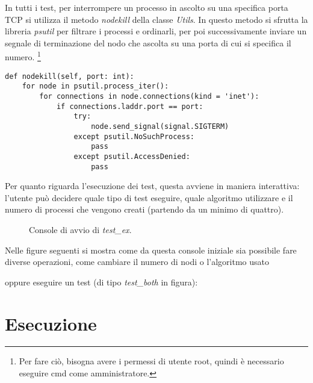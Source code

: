 \documentclass[conference]{IEEEtran}
\begin{document}
In tutti i test, per interrompere un processo in ascolto su una specifica porta TCP si utilizza il metodo \textit{nodekill} della classe \textit{Utils}.
In questo metodo si sfrutta la libreria \textit{psutil} per filtrare i processi e ordinarli, per poi successivamente inviare un segnale di terminazione del nodo che ascolta su una porta di cui si specifica il numero. \footnote{Per fare ciò, bisogna avere i permessi di utente root, quindi è necessario eseguire cmd come amministratore.}

\begin{lstlisting}
def nodekill(self, port: int):
    for node in psutil.process_iter():
        for connections in node.connections(kind = 'inet'):
            if connections.laddr.port == port:
                try:
                    node.send_signal(signal.SIGTERM)
                except psutil.NoSuchProcess:
                    pass
                except psutil.AccessDenied:
                    pass
\end{lstlisting}

Per quanto riguarda l'esecuzione dei test, questa avviene in maniera interattiva: l'utente può decidere quale tipo di test eseguire, quale algoritmo utilizzare e il numero di processi che vengono creati (partendo da un minimo di quattro).

\begin{figure}[htbp]
  \centering
  
  \caption{Console di avvio di \textit{test_ex}.}
\end{figure}

Nelle figure seguenti si mostra come da questa console iniziale sia possibile fare diverse operazioni, come cambiare il numero di nodi o l'algoritmo usato

\begin{figure}[htbp]
  \centering
  
\end{figure}

oppure eseguire un test (di tipo \textit{test\_both} in figura):

\begin{figure}[htbp]
  \centering
  
\end{figure}


\section{Esecuzione}
\end{document}
